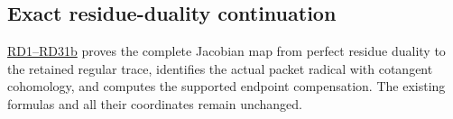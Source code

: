 \documentclass[
  10pt,
  a4paper,
]{article}
\begin{document}
\subsection{Exact residue-duality
continuation}\label{exact-residue-duality-continuation}

\href{COLLISION_RESIDUE_DUALITY_DERIVATION.md}{RD1--RD31b} proves the
complete Jacobian map from perfect residue duality to the retained
regular trace, identifies the actual packet radical with cotangent
cohomology, and computes the supported endpoint compensation. The
existing formulas and all their coordinates remain unchanged.
\end{document}
